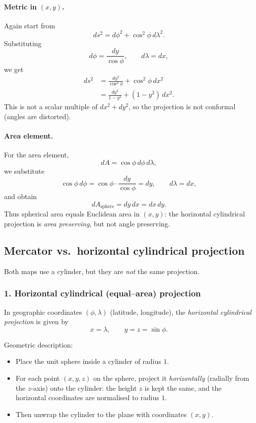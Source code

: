 \documentclass[12pt,a4paper]{article}
\theoremstyle{plain}
\theoremstyle{definition}      %
\begin{document}
\paragraph{Metric in $(x,y)$.}
Again start from
\[
ds^{2} = d\phi^{2} + \cos^{2}\phi\,d\lambda^{2}.
\]
Substituting
\[
d\phi = \frac{dy}{\cos\phi},\qquad d\lambda = dx,
\]
we get
\[
\begin{aligned}
	ds^{2}
	&= \frac{dy^{2}}{\cos^{2}\phi} + \cos^{2}\phi\,dx^{2} \\
	&= \frac{dy^{2}}{1-y^{2}} + (1-y^{2})\,dx^{2}.
\end{aligned}
\]
This is not a scalar multiple of $dx^{2}+dy^{2}$, so the projection is not
conformal (angles are distorted).

\paragraph{Area element.}
For the area element,
\[
dA = \cos\phi\,d\phi\,d\lambda,
\]
we substitute
\[
\cos\phi\,d\phi = \cos\phi\cdot\frac{dy}{\cos\phi} = dy,
\qquad d\lambda = dx,
\]
and obtain
\[
dA_{\text{sphere}} = dy\,dx = dx\,dy.
\]
Thus spherical area equals Euclidean area in $(x,y)$:
the horizontal cylindrical projection is \emph{area preserving}, but not
angle preserving.


\subsection*{Mercator vs.\ horizontal cylindrical projection}

Both maps use a cylinder, but they are \emph{not} the same projection.

\subsubsection*{1. Horizontal cylindrical (equal--area) projection}

In geographic coordinates $(\phi,\lambda)$ (latitude, longitude), the
\emph{horizontal cylindrical projection} is given by
\[
x = \lambda,\qquad y = z = \sin\phi.
\]

Geometric description:
\begin{itemize}
	\item Place the unit sphere inside a cylinder of radius $1$.
	\item For each point $(x,y,z)$ on the sphere, project it \emph{horizontally}
	(radially from the $z$-axis) onto the cylinder:
	the height $z$ is kept the same, and the horizontal coordinates
	are normalised to radius $1$.
	\item Then unwrap the cylinder to the plane with coordinates $(x,y)$.
\end{itemize}
\end{document}

